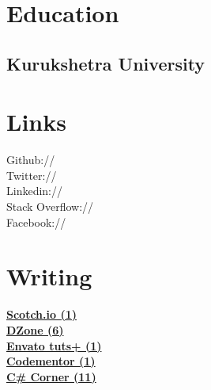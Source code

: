 \documentclass[]{gagan-resume}
\begin{document}
\begin{minipage}[t]{0.33\textwidth}
\section{Education} 

\subsection{Kurukshetra University}
\sectionsep




\section{Links} 
Github:// \href{https://github.com/sikrigagan}{} \\
Twitter://  \href{https://twitter.com/sikrigagan}{} \\
Linkedin://  \href{https://linkedin.com/in/sikrigagan}{} \\
Stack Overflow://  \href{https://stackoverflow.com/users/4129965/sikrigagan}{} \\
Facebook://  \href{https://facebook.com/sikrigagan}{}
\sectionsep




\section{Writing} 
\textbf{\href{https://scotch.io/@sikrigagan}{Scotch.io (1)}}\\
\textbf{\href{https://dzone.com/users/2733735/sikrigagan.html}{DZone (6)}}\\
\textbf{\href{https://tutsplus.com/authors/gagan-sikri}{Envato tuts+ (1)}}\\
\textbf{\href{https://www.codementor.io/sikrigagan}{Codementor (1)}}\\
\textbf{\href{http://www.c-sharpcorner.com/members/gagan-sikri}{C\# Corner (11)}}\\
\sectionsep



\end{minipage} 
\end{document}

